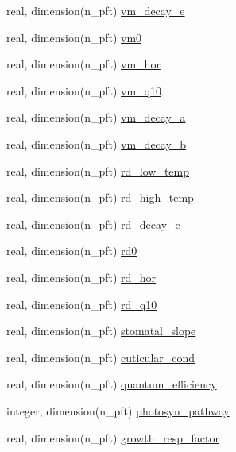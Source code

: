 \begin{DoxyCompactItemize}
\item 
real, dimension(n\+\_\+pft) \hyperlink{namespacepft__coms_a05c121e99b033c3fa874fc7ffd66fad3}{vm\+\_\+decay\+\_\+e}
\item 
real, dimension(n\+\_\+pft) \hyperlink{namespacepft__coms_a80a6462c48a36d9c1ab7bcf0b6296702}{vm0}
\item 
real, dimension(n\+\_\+pft) \hyperlink{namespacepft__coms_a1424943ac59ffe1e85af3d7eeca315bb}{vm\+\_\+hor}
\item 
real, dimension(n\+\_\+pft) \hyperlink{namespacepft__coms_a47018d91ecb1fe0c547ec131348e5fdd}{vm\+\_\+q10}
\item 
real, dimension(n\+\_\+pft) \hyperlink{namespacepft__coms_a2c9cb0165d22f8653900869b77019f4d}{vm\+\_\+decay\+\_\+a}
\item 
real, dimension(n\+\_\+pft) \hyperlink{namespacepft__coms_a21f9c00aea9610811aae2469b5070c1b}{vm\+\_\+decay\+\_\+b}
\item 
real, dimension(n\+\_\+pft) \hyperlink{namespacepft__coms_ad26dff15166122932a2a576c592451ba}{rd\+\_\+low\+\_\+temp}
\item 
real, dimension(n\+\_\+pft) \hyperlink{namespacepft__coms_a1bcf4f8ef5012e5ea47b2e5deb6dae4a}{rd\+\_\+high\+\_\+temp}
\item 
real, dimension(n\+\_\+pft) \hyperlink{namespacepft__coms_abc5e92f122fd2ebab52069105e512fa5}{rd\+\_\+decay\+\_\+e}
\item 
real, dimension(n\+\_\+pft) \hyperlink{namespacepft__coms_a52c1f01cac447b99de69af116c709b08}{rd0}
\item 
real, dimension(n\+\_\+pft) \hyperlink{namespacepft__coms_aa082b314a2092d3ee2b63f30cd1fc8be}{rd\+\_\+hor}
\item 
real, dimension(n\+\_\+pft) \hyperlink{namespacepft__coms_ac49f4aa4c8e6b1ab0c02f40ac0c443bd}{rd\+\_\+q10}
\item 
real, dimension(n\+\_\+pft) \hyperlink{namespacepft__coms_a36d072c9dc75fed2a29770bb892c0c8d}{stomatal\+\_\+slope}
\item 
real, dimension(n\+\_\+pft) \hyperlink{namespacepft__coms_a123da989ae706b508ed48db4a138ff8e}{cuticular\+\_\+cond}
\item 
real, dimension(n\+\_\+pft) \hyperlink{namespacepft__coms_ad1cdaf379a14e627f176105d6d744edb}{quantum\+\_\+efficiency}
\item 
integer, dimension(n\+\_\+pft) \hyperlink{namespacepft__coms_a697c05e70b11e609bd5316b8eed821ed}{photosyn\+\_\+pathway}
\item 
real, dimension(n\+\_\+pft) \hyperlink{namespacepft__coms_ae299a7616ce4a71415041f39e6e55d6c}{growth\+\_\+resp\+\_\+factor}

\end{DoxyCompactItemize}
